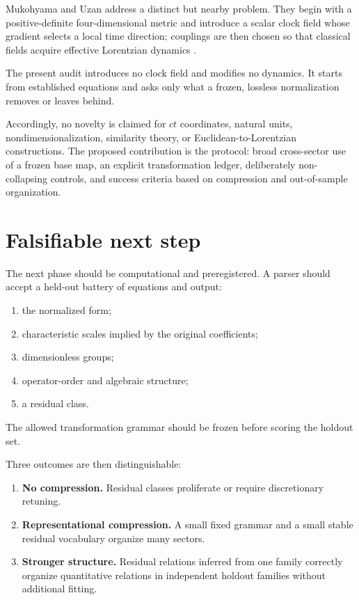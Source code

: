 \documentclass[10pt]{article}
\begin{document}
Mukohyama and Uzan address a distinct but nearby problem. They begin
with a positive-definite four-dimensional metric and introduce a
scalar clock field whose gradient selects a local time direction;
couplings are then chosen so that classical fields acquire effective
Lorentzian dynamics \cite{MukohyamaUzan2013}.

The present audit introduces no clock field and modifies no dynamics.
It starts from established equations and asks only what a frozen,
lossless normalization removes or leaves behind.

Accordingly, no novelty is claimed for \(ct\) coordinates, natural
units, nondimensionalization, similarity theory, or
Euclidean-to-Lorentzian constructions. The proposed contribution is
the protocol: broad cross-sector use of a frozen base map, an
explicit transformation ledger, deliberately non-collapsing
controls, and success criteria based on compression and
out-of-sample organization.

\section{Falsifiable next step}

The next phase should be computational and preregistered. A parser
should accept a held-out battery of equations and output:

\begin{enumerate}[leftmargin=1.5em,itemsep=0.15em,topsep=0.2em]
  \item the normalized form;
  \item characteristic scales implied by the original coefficients;
  \item dimensionless groups;
  \item operator-order and algebraic structure;
  \item a residual class.
\end{enumerate}

The allowed transformation grammar should be frozen before scoring
the holdout set.

Three outcomes are then distinguishable:

\begin{enumerate}[leftmargin=1.5em,itemsep=0.15em,topsep=0.2em]
  \item
  \textbf{No compression.}
  Residual classes proliferate or require discretionary retuning.

  \item
  \textbf{Representational compression.}
  A small fixed grammar and a small stable residual vocabulary
  organize many sectors.

  \item
  \textbf{Stronger structure.}
  Residual relations inferred from one family correctly organize
  quantitative relations in independent holdout families without
  additional fitting.
\end{enumerate}
\end{document}
